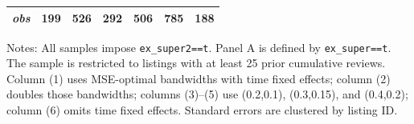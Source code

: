 \begin{table}[!htbp]
\begin{tabular}{lcccccc}
\textit{obs} & 199 & 526 & 292 & 506 & 785 & 188 \\
\bottomrule
\end{tabular}
\begin{minipage}{0.98\textwidth}\footnotesize
Notes: All samples impose \texttt{ex\_super2==t}. Panel A is defined by \texttt{ex\_super==t}. The sample is restricted to listings with at least 25 prior cumulative reviews. Column (1) uses MSE-optimal bandwidths with time fixed effects; column (2) doubles those bandwidths; columns (3)--(5) use (0.2,0.1), (0.3,0.15), and (0.4,0.2); column (6) omits time fixed effects. Standard errors are clustered by listing ID.
\end{minipage}
\end{table}
